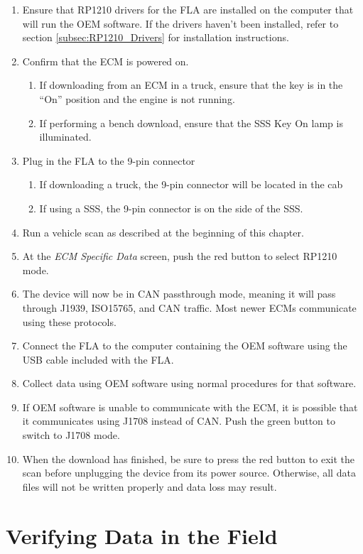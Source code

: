 \documentclass[11pt, oneside]{book}
\begin{document}
\begin{enumerate}
\item Ensure that RP1210 drivers for the FLA are installed on the computer that will run the OEM software.
      If the drivers haven't been installed, refer to section \ref{subsec:RP1210_Drivers} for installation instructions.
\item Confirm that the ECM is powered on.
  \begin{enumerate}
     \item If downloading from an ECM in a truck, ensure that the key is in the ``On'' position and the engine is not running.
     \item If performing a bench download, ensure that the SSS Key On lamp is illuminated.
  \end{enumerate}
\item Plug in the FLA to the 9-pin connector
  \begin{enumerate}
     \item If downloading a truck, the 9-pin connector will be located in the cab
     \item If using a SSS, the 9-pin connector is on the side of the SSS.
  \end{enumerate}
\item Run a vehicle scan as described at the beginning of this chapter.
\item At the \emph{ECM Specific Data} screen, push the red button to select RP1210 mode.
\item The device will now be in CAN passthrough mode, meaning it will pass through J1939, ISO15765, and CAN traffic. Most newer ECMs communicate using these protocols.
\item Connect the FLA to the computer containing the OEM software using the USB cable included with the FLA.
\item Collect data using OEM software using normal procedures for that software.
\item If OEM software is unable to communicate with the ECM, it is possible that it communicates using J1708 instead of CAN. Push the green button to switch to J1708 mode.
\item When the download has finished, be sure to press the red button to exit the scan before unplugging the device from its power source.
      Otherwise, all data files will not be written properly and data loss may result.
\end{enumerate}
  
\chapter{Verifying Data in the Field}
\end{document}
